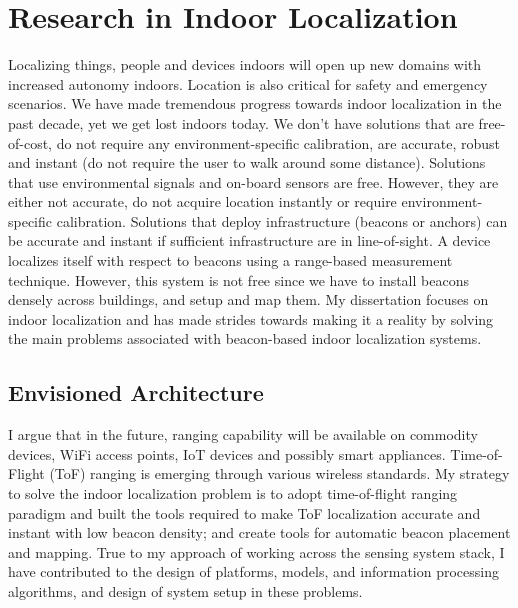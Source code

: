 \documentclass[10pt]{article}
\begin{document}
\section{Research in Indoor Localization}

Localizing things, people and devices indoors will open up new domains with increased autonomy indoors. %
Location is also critical for safety and emergency scenarios. %
We have made tremendous progress towards indoor localization in the past decade, yet we get lost indoors today.  %
We don't have solutions that are free-of-cost, do not require any environment-specific calibration, are accurate, robust and instant (do not require the user to walk around some distance). Solutions that use environmental signals and on-board sensors are free. However, they are either not accurate, do not acquire location instantly or require environment-specific calibration. Solutions that deploy infrastructure (beacons or anchors) can be accurate and instant if sufficient infrastructure  are in line-of-sight. A device localizes itself with respect to beacons using a range-based measurement technique. %
However, this system is not free since we have to install beacons densely across buildings, and setup and map them. My dissertation focuses on indoor localization and has made %
strides towards making it a reality by solving the main problems associated with beacon-based indoor localization systems.\\

\subsection{Envisioned Architecture}
I argue that in the future, ranging capability will be available on commodity devices, WiFi access points, IoT devices and possibly smart appliances. 
Time-of-Flight (ToF) ranging is emerging through various wireless standards. My strategy to solve the indoor localization problem is to adopt time-of-flight ranging paradigm and built the tools required to make ToF localization accurate and instant with low beacon density; and create tools for automatic beacon placement and mapping. True to my approach of working across the sensing system stack, I have contributed to the design of platforms, models, and information processing algorithms, and design of system setup in these problems.\\
\end{document}
